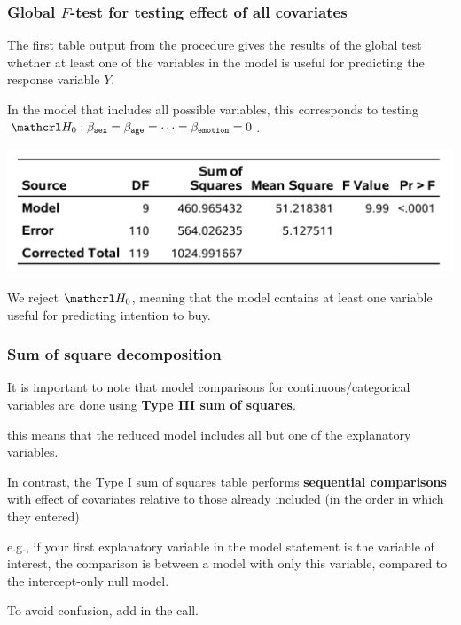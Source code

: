 \documentclass{beamer}
\begin{document}
\begin{frame}[fragile]
\frametitle{Global $F$-test for testing effect of all covariates}
\bi
\item The first table output from the \SASlang {} procedure gives the results of the global test whether at least one of the variables in the model is useful for predicting the response variable $Y$.
\item In the model that includes all possible variables, this corresponds to testing $\Hy_0:  \beta_{\code{sex}}=\beta_{\code{age}}=\cdots =\beta_{\code{emotion}}=0$.
\begin{center}
\includegraphics[width = 0.7\linewidth]{img/c2/slides3-e12}
\end{center}
\item We reject $\Hy_0$, meaning that the model contains at least one variable useful for predicting intention to buy.
\ei
\end{frame}
\begin{frame}[fragile]
\frametitle{Sum of square decomposition}
 \bi \item It is important to note that model comparisons for continuous/categorical variables are done using \textbf{Type III sum of squares}.
 \bi \item this means that the reduced model includes all but one of the explanatory variables.
 \ei \item In contrast, the Type I sum of squares table performs \textbf{sequential comparisons} with effect of covariates relative to those already included (in the order in which they entered)
 \bi \item e.g., if your first explanatory variable in the model statement is the variable of interest, the comparison is between a model with only this variable, compared to the intercept-only null model.
 \ei
 \item To avoid confusion, add  in the \SASlang call.
 \ei 
\end{frame}
\end{document}

